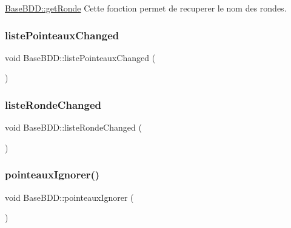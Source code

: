 \hyperlink{class_base_b_d_d_ad72a05677ec0613187ede9eb08f921b9}{Base\+B\+D\+D\+::get\+Ronde} Cette fonction permet de recuperer le nom des rondes. 

\mbox{\label{class_base_b_d_d_aef78a59308e7f9ee23dfb62e7664d57a}} 
\subsubsection{\texorpdfstring{liste\+Pointeaux\+Changed}{listePointeauxChanged}}
{\footnotesize\ttfamily void Base\+B\+D\+D\+::liste\+Pointeaux\+Changed (\begin{DoxyParamCaption}{ }\end{DoxyParamCaption})\hspace{0.3cm}{\ttfamily [signal]}}

\mbox{\label{class_base_b_d_d_a0e86919a03af0f469f351ea215f76340}} 
\subsubsection{\texorpdfstring{liste\+Ronde\+Changed}{listeRondeChanged}}
{\footnotesize\ttfamily void Base\+B\+D\+D\+::liste\+Ronde\+Changed (\begin{DoxyParamCaption}{ }\end{DoxyParamCaption})\hspace{0.3cm}{\ttfamily [signal]}}

\mbox{\label{class_base_b_d_d_acbdf1ddaaaff9fa469ecef3a14ef1081}} 
\subsubsection{\texorpdfstring{pointeaux\+Ignorer()}{pointeauxIgnorer()}}
{\footnotesize\ttfamily void Base\+B\+D\+D\+::pointeaux\+Ignorer (\begin{DoxyParamCaption}{ }\end{DoxyParamCaption})}



